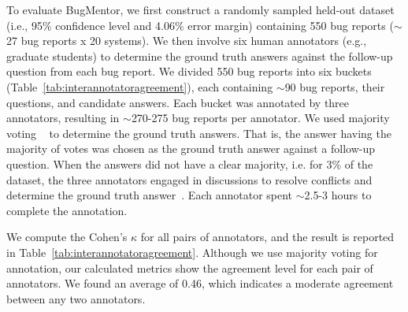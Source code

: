 To evaluate BugMentor, we first construct a randomly sampled held-out dataset (i.e., 95\% confidence level and 4.06\% error margin) containing 550 bug reports ($\sim$27 bug reports x 20 systems). We then involve six human annotators (e.g., graduate students) to determine the ground truth answers against the follow-up question from each bug report. We divided 550 bug reports into six buckets (Table~\ref{tab:interannotatoragreement}), each containing $\sim$90 bug reports, their questions, and candidate answers. Each bucket was annotated by three annotators, resulting in $\sim$270-275 bug reports per annotator. We used majority voting ~\cite{kuhrmann2017pragmatic} to determine the ground truth answers. That is, the answer having the majority of votes was chosen as the ground truth answer against a follow-up question. When the answers did not have a clear majority, i.e. for 3\% of the dataset, the three annotators engaged in discussions to resolve conflicts and determine the ground truth answer~\cite{kuhrmann2017pragmatic}. Each annotator spent $\sim$2.5-3 hours to complete the annotation. \par

We compute the Cohen's \emph{$\kappa$} for all pairs of annotators, and the result is reported in Table~\ref{tab:interannotatoragreement}. Although we use majority voting for annotation, our calculated metrics show the agreement level for each pair of annotators. We found an average of 0.46, which indicates a moderate agreement between any two annotators.\par

